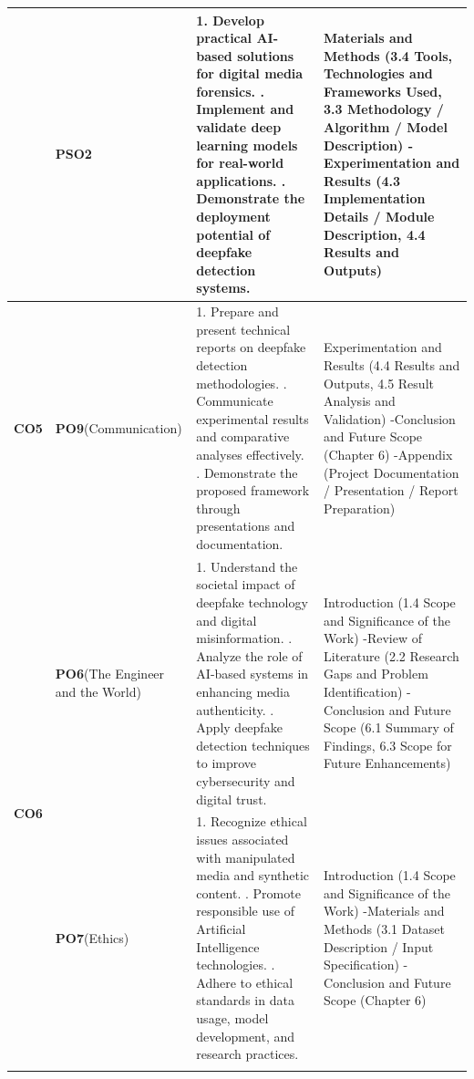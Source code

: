 \documentclass[12pt,a4paper]{report}
\begin{document}
\begin{longtable}{|c|p{2.5cm}|p{7.5cm}|p{4.0cm}|}
& {\textbf{PSO2}}
& 1. Develop practical AI-based solutions for digital media forensics.
  \newline 2. Implement and validate deep learning models for real-world applications.
  \newline 3. Demonstrate the deployment potential of deepfake detection systems.
& Materials and Methods (3.4 Tools, Technologies and Frameworks Used,  3.3 Methodology / Algorithm / Model Description) -Experimentation and Results (4.3 Implementation Details / Module Description, 4.4 Results and Outputs) \\ \hline

\textbf{CO5}
& {\textbf{PO9}\newline(Communication)}
& 1. Prepare and present technical reports on deepfake detection methodologies.
  \newline 2. Communicate experimental results and comparative analyses effectively.
  \newline 3. Demonstrate the proposed framework through presentations and documentation.
& Experimentation and Results (4.4 Results and Outputs, 4.5 Result Analysis and Validation) -Conclusion and Future Scope (Chapter 6) -Appendix (Project Documentation / Presentation / Report Preparation) \\ \hline

\multirow{3}{*}{\textbf{CO6}}
& {\textbf{PO6}\newline(The Engineer and the World)}
& 1. Understand the societal impact of deepfake technology and digital misinformation.
  \newline 2. Analyze the role of AI-based systems in enhancing media authenticity.
  \newline 3. Apply deepfake detection techniques to improve cybersecurity and digital trust.
& Introduction (1.4 Scope and Significance of the Work) -Review of Literature (2.2 Research Gaps and Problem Identification) -Conclusion and Future Scope (6.1 Summary of Findings, 6.3 Scope for Future Enhancements) \\ \cline{2-4}

& {\textbf{PO7}\newline(Ethics)}
& 1. Recognize ethical issues associated with manipulated media and synthetic content.
  \newline 2. Promote responsible use of Artificial Intelligence technologies.
  \newline 3. Adhere to ethical standards in data usage, model development, and research practices.
& Introduction (1.4 Scope and Significance of the Work) -Materials and Methods (3.1 Dataset Description / Input Specification) -Conclusion and Future Scope (Chapter 6) \\ \cline{2-4}


\end{longtable}
\end{document}
